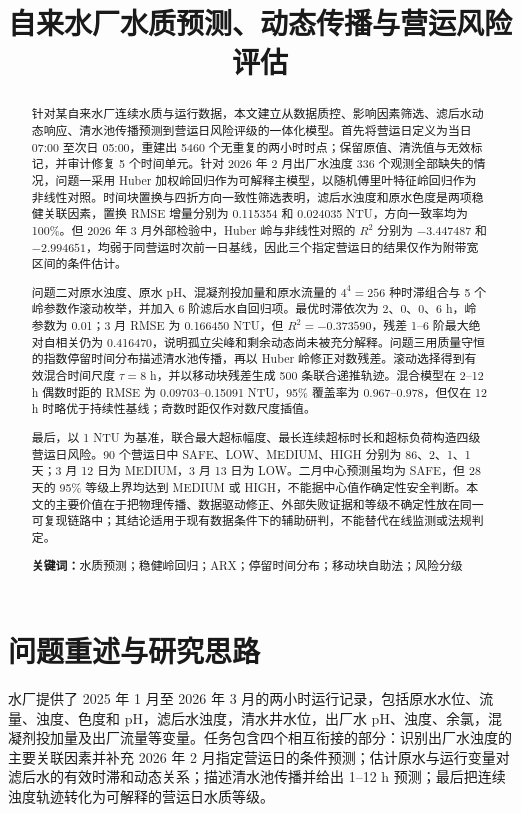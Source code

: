 \documentclass[UTF8,12pt,a4paper]{ctexart}
\title{自来水厂水质预测、动态传播与营运风险评估}
\author{}
\date{}
\newcommand{\keywords}[1]{\par\noindent\textbf{关键词：}#1}
\newcommand{\Rtwo}{R^{2}}
\begin{document}
\maketitle

\begin{abstract}
针对某自来水厂连续水质与运行数据，本文建立从数据质控、影响因素筛选、滤后水动态响应、清水池传播预测到营运日风险评级的一体化模型。首先将营运日定义为当日 07:00 至次日 05:00，重建出 5460 个无重复的两小时时点；保留原值、清洗值与无效标记，并审计修复 5 个时间单元。针对 2026 年 2 月出厂水浊度 336 个观测全部缺失的情况，问题一采用 Huber 加权岭回归作为可解释主模型，以随机傅里叶特征岭回归作为非线性对照。时间块置换与四折方向一致性筛选表明，滤后水浊度和原水色度是两项稳健关联因素，置换 RMSE 增量分别为 0.115354 和 0.024035 NTU，方向一致率均为 100\%。但 2026 年 3 月外部检验中，Huber 岭与非线性对照的 $\Rtwo$ 分别为 $-3.447487$ 和 $-2.994651$，均弱于同营运时次前一日基线，因此三个指定营运日的结果仅作为附带宽区间的条件估计。

问题二对原水浊度、原水 pH、混凝剂投加量和原水流量的 $4^4=256$ 种时滞组合与 5 个岭参数作滚动枚举，并加入 6 阶滤后水自回归项。最优时滞依次为 2、0、0、6 h，岭参数为 0.01；3 月 RMSE 为 0.166450 NTU，但 $\Rtwo=-0.373590$，残差 1--6 阶最大绝对自相关仍为 0.416470，说明孤立尖峰和剩余动态尚未被充分解释。问题三用质量守恒的指数停留时间分布描述清水池传播，再以 Huber 岭修正对数残差。滚动选择得到有效混合时间尺度 $\tau=8$ h，并以移动块残差生成 500 条联合递推轨迹。混合模型在 2--12 h 偶数时距的 RMSE 为 0.09703--0.15091 NTU，95\% 覆盖率为 0.967--0.978，但仅在 12 h 时略优于持续性基线；奇数时距仅作对数尺度插值。

最后，以 1 NTU 为基准，联合最大超标幅度、最长连续超标时长和超标负荷构造四级营运日风险。90 个营运日中 SAFE、LOW、MEDIUM、HIGH 分别为 86、2、1、1 天；3 月 12 日为 MEDIUM，3 月 13 日为 LOW。二月中心预测虽均为 SAFE，但 28 天的 95\% 等级上界均达到 MEDIUM 或 HIGH，不能据中心值作确定性安全判断。本文的主要价值在于把物理传播、数据驱动修正、外部失败证据和等级不确定性放在同一可复现链路中；其结论适用于现有数据条件下的辅助研判，不能替代在线监测或法规判定。

\keywords{水质预测；稳健岭回归；ARX；停留时间分布；移动块自助法；风险分级}
\end{abstract}

\section{问题重述与研究思路}

水厂提供了 2025 年 1 月至 2026 年 3 月的两小时运行记录，包括原水水位、流量、浊度、色度和 pH，滤后水浊度，清水井水位，出厂水 pH、浊度、余氯，混凝剂投加量及出厂流量等变量。任务包含四个相互衔接的部分：识别出厂水浊度的主要关联因素并补充 2026 年 2 月指定营运日的条件预测；估计原水与运行变量对滤后水的有效时滞和动态关系；描述清水池传播并给出 1--12 h 预测；最后把连续浊度轨迹转化为可解释的营运日水质等级。
\end{document}
